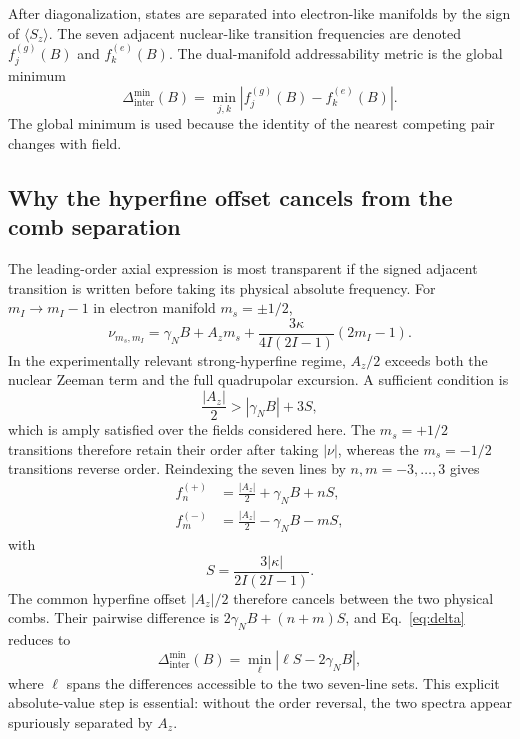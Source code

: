 \documentclass[11pt]{article}
\newcommand{\DeltaInter}{\Delta_{\mathrm{inter}}^{\min}}
\begin{document}
After diagonalization, states are separated into electron-like manifolds by the sign of $\langle S_z\rangle$. The seven adjacent nuclear-like transition frequencies are denoted $f_j^{(g)}(B)$ and $f_k^{(e)}(B)$. The dual-manifold addressability metric is the global minimum
\begin{equation}
\DeltaInter(B)=\min_{j,k}\left|f_j^{(g)}(B)-f_k^{(e)}(B)\right|.
\label{eq:delta}
\end{equation}
The global minimum is used because the identity of the nearest competing pair changes with field.

\subsection{Why the hyperfine offset cancels from the comb separation}
The leading-order axial expression is most transparent if the signed adjacent transition is written before taking its physical absolute frequency. For $m_I\rightarrow m_I-1$ in electron manifold $m_s=\pm1/2$,
\begin{equation}
\nu_{m_s,m_I}=\gamma_NB+A_zm_s+\frac{3\kappa}{4I(2I-1)}(2m_I-1).
\label{eq:signed}
\end{equation}
In the experimentally relevant strong-hyperfine regime, $A_z/2$ exceeds both the nuclear Zeeman term and the full quadrupolar excursion. A sufficient condition is
\begin{equation}
\frac{|A_z|}{2}>|\gamma_NB|+3S,
\label{eq:stronghf}
\end{equation}
which is amply satisfied over the fields considered here. The $m_s=+1/2$ transitions therefore retain their order after taking $|\nu|$, whereas the $m_s=-1/2$ transitions reverse order. Reindexing the seven lines by $n,m=-3,\ldots,3$ gives
\begin{align}
f_n^{(+)}&=\frac{|A_z|}{2}+\gamma_NB+nS,\\
f_m^{(-)}&=\frac{|A_z|}{2}-\gamma_NB-mS,
\end{align}
with
\begin{equation}
S=\frac{3|\kappa|}{2I(2I-1)}.
\label{eq:Sgeneral}
\end{equation}
The common hyperfine offset $|A_z|/2$ therefore cancels between the two physical combs. Their pairwise difference is $2\gamma_NB+(n+m)S$, and Eq.~\eqref{eq:delta} reduces to
\begin{equation}
\DeltaInter(B)=\min_{\ell}|\ell S-2\gamma_NB|,
\label{eq:comb}
\end{equation}
where $\ell$ spans the differences accessible to the two seven-line sets. This explicit absolute-value step is essential: without the order reversal, the two spectra appear spuriously separated by $A_z$.
\end{document}
